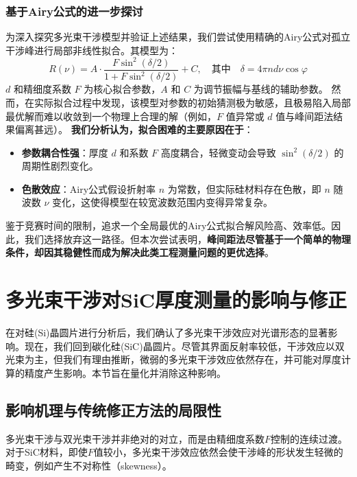 \documentclass[withoutpreface,bwprint]{cumcmthesis} %
\begin{document}
\subsubsection{基于Airy公式的进一步探讨}
为深入探究多光束干涉模型并验证上述结果，我们尝试使用精确的Airy公式对孤立干涉峰进行局部非线性拟合。其模型为：
$$
    R(\nu) = A \cdot \frac{F \sin^2(\delta/2)}{1 + F \sin^2(\delta/2)} + C, \quad \text{其中} \quad \delta = 4\pi n d \nu \cos\varphi
$$
$d$ 和精细度系数 $F$ 为核心拟合参数，$A$ 和 $C$ 为调节振幅与基线的辅助参数。
然而，在实际拟合过程中发现，该模型对参数的初始猜测极为敏感，且极易陷入局部最优解而难以收敛到一个物理上合理的解（例如，$F$ 值异常或 $d$ 值与峰间距法结果偏离甚远）。
\textbf{我们分析认为，拟合困难的主要原因在于}：
\begin{itemize}
    \item \textbf{参数耦合性强}：厚度 $d$ 和系数 $F$ 高度耦合，轻微变动会导致 $\sin^2(\delta/2)$ 的周期性剧烈变化。
    \item \textbf{色散效应}：Airy公式假设折射率 $n$ 为常数，但实际硅材料存在色散，即 $n$ 随波数 $\nu$ 变化，这使得模型在较宽波数范围内变得异常复杂。
\end{itemize}
鉴于竞赛时间的限制，追求一个全局最优的Airy公式拟合解风险高、效率低。因此，我们选择放弃这一路径。但本次尝试表明，\textbf{峰间距法尽管基于一个简单的物理条件，却因其稳健性而成为解决此类工程测量问题的更优选择}。



\section{多光束干涉对SiC厚度测量的影响与修正}

在对硅(Si)晶圆片进行分析后，我们确认了多光束干涉效应对光谱形态的显著影响。现在，我们回到碳化硅(SiC)晶圆片。尽管其界面反射率较低，干涉效应以双光束为主，但我们有理由推断，微弱的多光束干涉效应依然存在，并可能对厚度计算的精度产生影响。本节旨在量化并消除这种影响。

\subsection{影响机理与传统修正方法的局限性}

多光束干涉与双光束干涉并非绝对的对立，而是由精细度系数$F$控制的连续过渡。对于SiC材料，即使$F$值较小，多光束干涉效应依然会使干涉峰的形状发生轻微的畸变，例如产生不对称性（skewness）。
\end{document}
